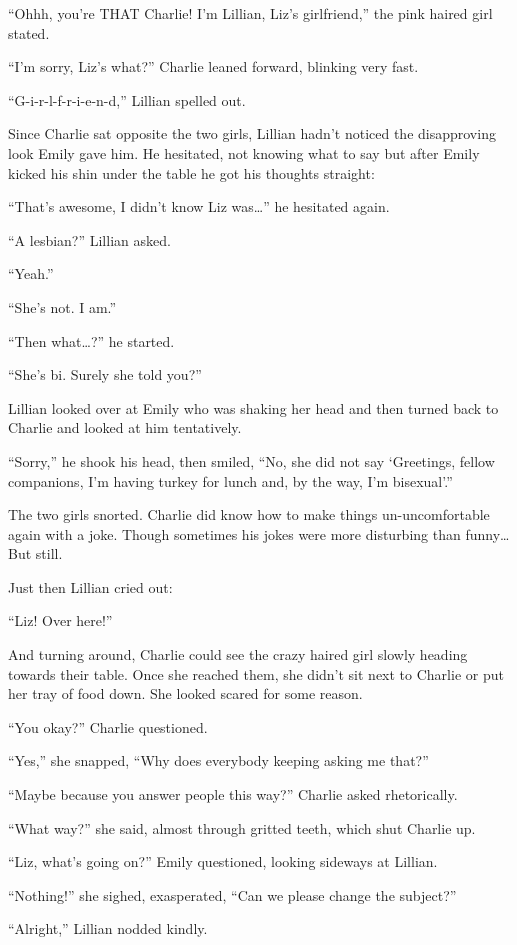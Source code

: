 “Ohhh, you’re THAT Charlie! I’m Lillian, Liz’s girlfriend,” the pink haired girl stated.

“I’m sorry, Liz’s what?” Charlie leaned forward, blinking very fast.

“G-i-r-l-f-r-i-e-n-d,” Lillian spelled out.

Since Charlie sat opposite the two girls, Lillian hadn’t noticed the disapproving look Emily gave him. He hesitated, not knowing what to say but after Emily kicked his shin under the table he got his thoughts straight:

“That’s awesome, I didn’t know Liz was…” he hesitated again.

“A lesbian?” Lillian asked.

“Yeah.”

“She’s not. I am.”

“Then what…?” he started.

“She’s bi. Surely she told you?”

Lillian looked over at Emily who was shaking her head and then turned back to Charlie and looked at him tentatively.

“Sorry,” he shook his head, then smiled, “No, she did not say ‘Greetings, fellow companions, I’m having turkey for lunch and, by the way, I’m bisexual’.”

The two girls snorted. Charlie did know how to make things un-uncomfortable again with a joke. Though sometimes his jokes were more disturbing than funny…  But still.

Just then Lillian cried out:

“Liz! Over here!”

And turning around, Charlie could see the crazy haired girl slowly heading towards their table. Once she reached them, she didn’t sit next to Charlie or put her tray of food down. She looked scared for some reason.

“You okay?” Charlie questioned.

“Yes,” she snapped, “Why does everybody keeping asking me that?”

“Maybe because you answer people this way?” Charlie asked rhetorically.

“What way?” she said, almost through gritted teeth, which shut Charlie up.

“Liz, what’s going on?” Emily questioned, looking sideways at Lillian.

“Nothing!” she sighed, exasperated, “Can we please change the subject?”

“Alright,” Lillian nodded kindly.


